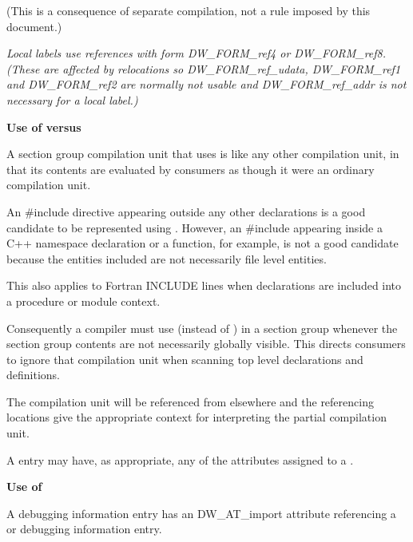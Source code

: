 (This is a consequence of separate compilation, not a rule
imposed by this document.)

\textit{Local labels use references with form DW\_FORM\_ref4
or 
DW\_FORM\_ref8. 
(These are affected by relocations
so 
DW\_FORM\_ref\_udata, 
DW\_FORM\_ref1 and 
DW\_FORM\_ref2 are
normally not usable and 
DW\_FORM\_ref\_addr is not necessary
for a local label.)}

\textbf{Use of  versus 
}

A section group compilation unit that uses 
is like any other compilation unit, in that its contents
are evaluated by consumers as though it were an ordinary
compilation unit.

An \#include directive appearing outside any other
declarations is a good candidate to be represented using
. 
However, an \#include appearing inside
a C++ namespace declaration or a function, for example, is
not a good candidate because the entities included are not
necessarily file level entities.

This also applies to Fortran INCLUDE lines when declarations
are included into a procedure or module context.

Consequently a compiler must use  (instead
of ) in a section group whenever the section
group contents are not necessarily globally visible. This
directs consumers to ignore that compilation unit when scanning
top level declarations and definitions.

The  compilation unit will be referenced
from elsewhere and the referencing locations give the
appropriate context for interpreting the partial compilation
unit.

A  entry may have, as appropriate, any of
the attributes assigned to a .


\textbf{Use of }

A  debugging information entry has an
DW\_AT\_import attribute referencing a  or
 debugging information entry.

